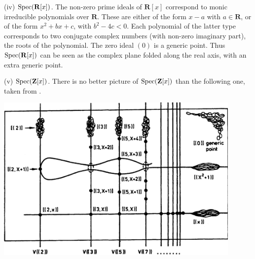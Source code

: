\noindent
(iv) $\operatorname{Spec}(\mathbf R[x])$.
The non-zero prime ideals of $\mathbf R[x]$ correspond to monic irreducible polynomials over $\mathbf R$.
These are either of the form $x - a$ with $a \in \mathbf R$, or of the form $x^2 + bx + c$, with $b^2 - 4c < 0$.
Each polynomial of the latter type corresponds to two conjugate complex numbers (with non-zero imaginary part), the roots of the polynomial.
The zero ideal $(0)$ is a generic point.
Thus $\operatorname{Spec}(\mathbf R[x])$ can be seen as the complex plane folded along the real axis, with an extra generic point.


\noindent
(v) $\operatorname{Spec}(\mathbf Z[x])$.
There is no better picture of $\operatorname{Spec}(\mathbf Z[x])$ than the following one, taken from \cite[II, \S1, Example H]{MumfordRedBook}.
\begin{center}
\includegraphics[width=0.9\textwidth]{atiyah-macdonald/images/Spec(Z[x])}
\end{center}














